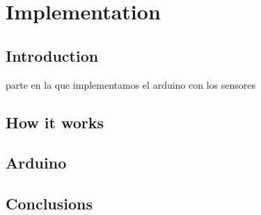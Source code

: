 \chapter{Implementation}\label{cap:implementacion}

\section{Introduction}
parte en la que implementamos el arduino con los sensores

\section {How it works}

\section{Arduino}

\section{Conclusions}

